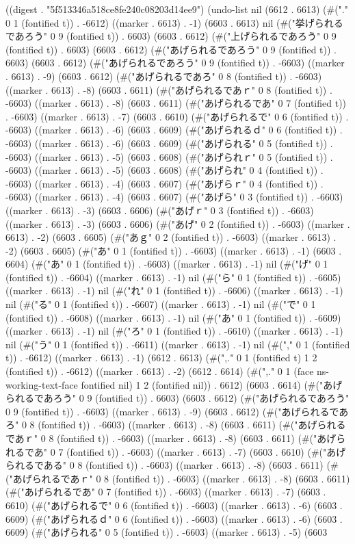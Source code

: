 
((digest . "5f513346a518ce8fe240c08203d14ee9") (undo-list nil (6612 . 6613) (#("." 0 1 (fontified t)) . -6612) ((marker . 6613) . -1) (6603 . 6613) nil (#("挙げられるであろう" 0 9 (fontified t)) . 6603) (6603 . 6612) (#("上げられるであろう" 0 9 (fontified t)) . 6603) (6603 . 6612) (#("あげられるであろう" 0 9 (fontified t)) . 6603) (6603 . 6612) (#("あげられるであろう" 0 9 (fontified t)) . -6603) ((marker . 6613) . -9) (6603 . 6612) (#("あげられるであろ" 0 8 (fontified t)) . -6603) ((marker . 6613) . -8) (6603 . 6611) (#("あげられるであｒ" 0 8 (fontified t)) . -6603) ((marker . 6613) . -8) (6603 . 6611) (#("あげられるであ" 0 7 (fontified t)) . -6603) ((marker . 6613) . -7) (6603 . 6610) (#("あげられるで" 0 6 (fontified t)) . -6603) ((marker . 6613) . -6) (6603 . 6609) (#("あげられるｄ" 0 6 (fontified t)) . -6603) ((marker . 6613) . -6) (6603 . 6609) (#("あげられる" 0 5 (fontified t)) . -6603) ((marker . 6613) . -5) (6603 . 6608) (#("あげられｒ" 0 5 (fontified t)) . -6603) ((marker . 6613) . -5) (6603 . 6608) (#("あげられ" 0 4 (fontified t)) . -6603) ((marker . 6613) . -4) (6603 . 6607) (#("あげらｒ" 0 4 (fontified t)) . -6603) ((marker . 6613) . -4) (6603 . 6607) (#("あげら" 0 3 (fontified t)) . -6603) ((marker . 6613) . -3) (6603 . 6606) (#("あげｒ" 0 3 (fontified t)) . -6603) ((marker . 6613) . -3) (6603 . 6606) (#("あげ" 0 2 (fontified t)) . -6603) ((marker . 6613) . -2) (6603 . 6605) (#("あｇ" 0 2 (fontified t)) . -6603) ((marker . 6613) . -2) (6603 . 6605) (#("あ" 0 1 (fontified t)) . -6603) ((marker . 6613) . -1) (6603 . 6604) (#("あ" 0 1 (fontified t)) . -6603) ((marker . 6613) . -1) nil (#("げ" 0 1 (fontified t)) . -6604) ((marker . 6613) . -1) nil (#("ら" 0 1 (fontified t)) . -6605) ((marker . 6613) . -1) nil (#("れ" 0 1 (fontified t)) . -6606) ((marker . 6613) . -1) nil (#("る" 0 1 (fontified t)) . -6607) ((marker . 6613) . -1) nil (#("で" 0 1 (fontified t)) . -6608) ((marker . 6613) . -1) nil (#("あ" 0 1 (fontified t)) . -6609) ((marker . 6613) . -1) nil (#("ろ" 0 1 (fontified t)) . -6610) ((marker . 6613) . -1) nil (#("う" 0 1 (fontified t)) . -6611) ((marker . 6613) . -1) nil (#("," 0 1 (fontified t)) . -6612) ((marker . 6613) . -1) (6612 . 6613) (#(",." 0 1 (fontified t) 1 2 (fontified t)) . -6612) ((marker . 6613) . -2) (6612 . 6614) (#(",." 0 1 (face ns-working-text-face fontified nil) 1 2 (fontified nil)) . 6612) (6603 . 6614) (#("あげられるであろう" 0 9 (fontified t)) . 6603) (6603 . 6612) (#("あげられるであろう" 0 9 (fontified t)) . -6603) ((marker . 6613) . -9) (6603 . 6612) (#("あげられるであろ" 0 8 (fontified t)) . -6603) ((marker . 6613) . -8) (6603 . 6611) (#("あげられるであｒ" 0 8 (fontified t)) . -6603) ((marker . 6613) . -8) (6603 . 6611) (#("あげられるであ" 0 7 (fontified t)) . -6603) ((marker . 6613) . -7) (6603 . 6610) (#("あげられるである" 0 8 (fontified t)) . -6603) ((marker . 6613) . -8) (6603 . 6611) (#("あげられるであｒ" 0 8 (fontified t)) . -6603) ((marker . 6613) . -8) (6603 . 6611) (#("あげられるであ" 0 7 (fontified t)) . -6603) ((marker . 6613) . -7) (6603 . 6610) (#("あげられるで" 0 6 (fontified t)) . -6603) ((marker . 6613) . -6) (6603 . 6609) (#("あげられるｄ" 0 6 (fontified t)) . -6603) ((marker . 6613) . -6) (6603 . 6609) (#("あげられる" 0 5 (fontified t)) . -6603) ((marker . 6613) . -5) (6603 